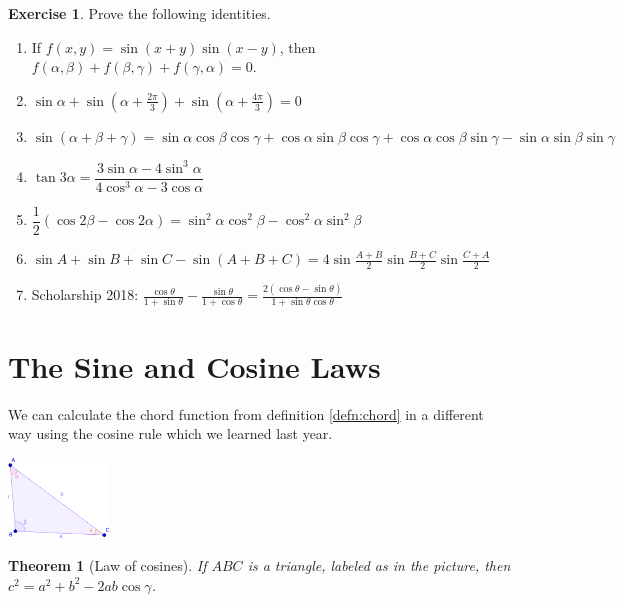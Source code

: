\documentclass[a4paper,leqno]{article}
\newcommand{\marginsymbol}{\marginpar{\hfill(\ding{43})}}
\numberwithin{equation}{section}
\newtheorem{thm}[equation]{Theorem}
\theoremstyle{definition}
\newtheorem{exercise}[equation]{Exercise}
\theoremstyle{remark}
\begin{document}
\begin{exercise}
  Prove the following identities.
  \begin{enumerate}
    \item If $ f(x,y) = \sin(x+y) \sin(x-y) $, then $ f(\alpha,\beta) + f(\beta,\gamma) + f(\gamma,\alpha) = 0 $.
    \item $ \sin \alpha + \sin\left(\alpha + \frac{2\pi}{3}\right) + \sin\left(\alpha + \frac{4\pi}{3}\right) = 0 $
    \item $ \sin(\alpha + \beta + \gamma) = \sin\alpha \cos\beta \cos\gamma + \cos\alpha\sin\beta\cos\gamma + \cos\alpha\cos\beta\sin\gamma - \sin\alpha\sin\beta\sin\gamma $
    \item $ \tan 3\alpha = \dfrac{3\sin\alpha - 4\sin^3 \alpha}{4\cos^3 \alpha - 3\cos\alpha} $
    \item $ \dfrac{1}{2}(\cos 2\beta - \cos 2\alpha) = \sin^2 \alpha \cos^2\beta - \cos^2\alpha \sin^2 \beta $
    \item $ \sin A + \sin B + \sin C - \sin (A + B + C) = 4\sin \frac{A + B}{2}\sin \frac{B + C}{2}\sin \frac{C + A}{2} $
    \item Scholarship 2018: $ \frac{\cos \theta}{1 + \sin \theta} - \frac{\sin \theta}{1 + \cos\theta} = \frac{2(\cos\theta - \sin\theta)}{1+ \sin\theta \cos \theta} $
  \end{enumerate}
\end{exercise}

\section{The Sine and Cosine Laws}
We can calculate the chord function from definition \ref{defn:chord} in a different way using the cosine rule which we learned last year.

\begin{center}
  \includegraphics[width=0.2\textwidth]{trisines}
\end{center}

\begin{thm}[Law of cosines]
  If $ ABC $ is a triangle, labeled as in the picture, then $ c^2 = a^2 + b^2 - 2ab \cos \gamma $.\marginsymbol
\end{thm}
\end{document}

